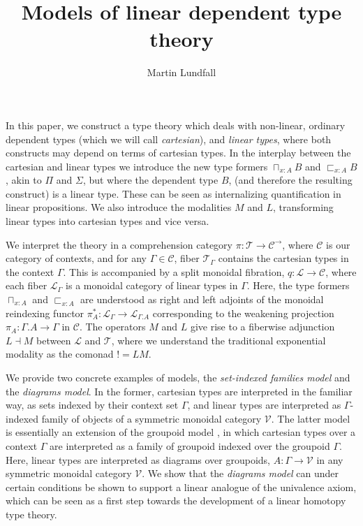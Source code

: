 
\usepackage[margin=0.5in]{geometry}
\usepackage{todonotes}

\newtheorem{lemm}[thm]{Lemma}
\newtheorem{remrk}[thm]{Remark}
\newtheorem{corl}[thm]{Corollary}
\newtheorem{expl}[thm]{Example}
\newtheorem{hyp}[thm]{Hypothesis}

\title{Models of linear dependent type theory}
\author{Martin Lundfall}
\maketitle
{}
\abstract
In this paper, we construct a type theory which deals with non-linear, ordinary dependent types (which we will call \textit{cartesian}), and \textit{linear types}, where both constructs may depend on terms of cartesian types. In the interplay between the cartesian and linear types we introduce the new type formers $\sqcap_{x : A}B$ and $\sqsubset_{x : A}B$, akin to $\Pi$ and $\Sigma$, but where the dependent type $B$, (and therefore the resulting construct) is a linear type. These can be seen as internalizing quantification in linear propositions. We also introduce the modalities $M$ and $L$, transforming linear types into cartesian types and vice versa.

We interpret the theory in a comprehension category $\pi : \mathcal{T} \to \mathcal{C}^\to$, where $\mathcal{C}$ is our category of contexts, and for any $\Gamma \in \mathcal{C}$, fiber $\mathcal{T}_\Gamma$ contains the cartesian types in the context $\Gamma$. This is accompanied by a split monoidal fibration, $q : \mathcal{L} \to \mathcal{C}$, where each fiber $\mathcal{L}_\Gamma$ is a monoidal category of linear types in $\Gamma$. Here, the type formers $\sqcap_{x :A}$ and $\sqsubset_{x : A}$ are understood as right and left adjoints of the monoidal reindexing functor $\pi_A^* : \mathcal{L}_\Gamma \to \mathcal{L}_{\Gamma.A}$ corresponding to the weakening projection $\pi_A : \Gamma.A \to \Gamma$ in $\mathcal{C}$. The operators $M$ and $L$ give rise to a fiberwise adjunction $L \dashv M$ between $\mathcal{L}$ and $\mathcal{T}$, where we understand the traditional exponential modality as the comonad $! = LM$.

We provide two concrete examples of models, the \textit{set-indexed families model} and the \textit{diagrams model}. In the former, cartesian types are interpreted in the familiar way, as sets indexed by their context set $\Gamma$, and linear types are interpreted as $\Gamma$-indexed family of objects of a symmetric monoidal category $\mathcal{V}$. The latter model is essentially an extension of the groupoid model \cite{hofmann1998}, in which cartesian types over a context $\Gamma$ are interpreted as a family of groupoid indexed over the groupoid $\Gamma$. Here, linear types are interpreted as diagrams over groupoids, $A : \Gamma \to \mathcal{V}$ in any symmetric monoidal category $\mathcal{V}$. We show that the \textit{diagrams model} can under certain conditions be shown to support a linear analogue of the univalence axiom, which can be seen as a first step towards the development of a linear homotopy type theory.
\newpage
\tableofcontents
\newpage
